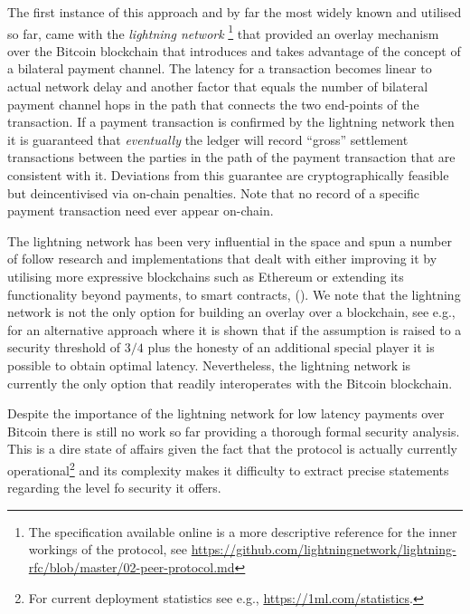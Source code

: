 The first instance of this approach and by far the most widely known and
utilised so far, 
came with the {\em lightning network } 
\cite{lightning}\footnote{The specification available online is a more descriptive reference for the inner workings of the protocol, see \url{https://github.com/lightningnetwork/lightning-rfc/blob/master/02-peer-protocol.md}} that provided an overlay mechanism over the Bitcoin blockchain that introduces and takes advantage of the concept of a bilateral payment channel. The latency for a transaction becomes linear to actual network delay and another factor that equals the number of bilateral payment channel hops in the path that  connects the two end-points of the transaction. If a payment  transaction is confirmed by the lightning network then  it is guaranteed that {\em eventually} the ledger will record ``gross'' settlement transactions between the parties in the path of the payment transaction that are consistent with it. Deviations from this guarantee are cryptographically feasible but deincentivised via on-chain penalties.   
Note that no record of a  specific payment transaction need ever appear on-chain. 

The lightning network has been very influential in the space and spun a number of follow research and implementations
that dealt with either improving it by utilising more 
expressive blockchains such as Ethereum \cite{sprites,perun} 
or extending its functionality beyond payments, to smart contracts, 
\cite{DBLP:conf/systor/LindNEKPS18} ().
We note that the lightning network is not the only option for building an overlay over a blockchain, see e.g.,  \cite{DBLP:conf/eurocrypt/PassS18} for an alternative approach where it is shown that if the assumption is raised to a security threshold of $3/4$ plus the honesty of an additional special player it is possible to obtain optimal latency. Nevertheless, the lightning network is currently the only option that readily interoperates with the Bitcoin blockchain. 

Despite the importance of the lightning network for low latency payments over Bitcoin there is still no work so far providing a thorough formal security analysis. 
This is a dire state of affairs given the fact that the protocol is actually currently operational\footnote{For current deployment statistics see e.g.,  \url{https://1ml.com/statistics}.}
and its complexity makes it difficulty to extract precise statements regarding the level fo security it offers. 

